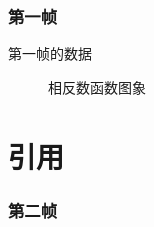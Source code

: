 \documentclass[aspectratio=169]{ctexbeamer}
\begin{document}
\frame
{
\frametitle{第一帧}
第一帧的数据
\begin{figure}
	\scalebox{0.8}{}
	\caption{相反数函数图象}
	\label{fig:opposite}
\end{figure}
}

\section{引用}
\frame
{
\frametitle{第二帧}

}
\end{document}

